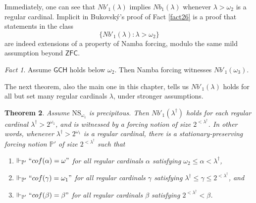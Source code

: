\documentclass[12pt, twoside]{memoir}
\numberwithin{equation}{section}
\newtheorem{thm}{Theorem}[section]
\theoremstyle{definition}
\theoremstyle{remark}
\newtheorem{fact}[thm]{Fact}
\theoremstyle{definition}
\theoremstyle{definition}
\theoremstyle{definition}
\theoremstyle{remark}
\begin{document}
Immediately, one can see that $Nb'_1(\lambda)$ implies $Nb_1(\lambda)$ whenever $\lambda > \omega_2$ is a regular cardinal. Implicit in Bukovsk\'{y}'s proof of Fact \ref{fact26} is a proof that statements in the class
\begin{equation*}
    \{Nb'_1(\lambda) : \lambda > \omega_2\}
\end{equation*}
are indeed extensions of a property of Namba forcing, modulo the same mild assumption beyond $\mathsf{ZFC}$.

\begin{fact}
Assume $\mathsf{GCH}$ holds below $\omega_2$. Then Namba forcing witnesses $Nb'_1(\omega_3)$.
\end{fact}

The next theorem, also the main one in this chapter, tells us $Nb'_1(\lambda)$ holds for all but set many regular cardinals $\lambda$, under stronger assumptions.

\begin{thm}\label{notion1}
Assume $\mathrm{NS}_{\omega_1}$ is precipitous. Then $Nb'_1(\lambda^{\dagger})$ holds for each regular cardinal $\lambda^{\dagger} > 2^{\omega_1}$, and is witnessed by a forcing notion of size $2^{< \lambda^{\dagger}}$. In other words, whenever $\lambda^{\dagger} > 2^{\omega_1}$ is a regular cardinal, there is a stationary-preserving forcing notion $\mathbb{P}'$ of size $2^{< \lambda^{\dagger}}$ such that 
\begin{enumerate}[label=(\arabic*)]
    \item\label{cond1} $\Vdash_{\mathbb{P}'} ``cof(\alpha) = \omega"$ for all regular cardinals $\alpha$ satisfying $\omega_2 \leq \alpha < \lambda^{\dagger}$,
    \item\label{cond2} $\Vdash_{\mathbb{P}'} ``cof(\gamma) = \omega_1"$ for all regular cardinals $\gamma$ satisfying $\lambda^{\dagger} \leq \gamma \leq 2^{< \lambda^{\dagger}}$, and
    \item\label{cond3} $\Vdash_{\mathbb{P}'} ``cof(\beta) = \beta"$ for all regular cardinals $\beta$ satisfying $2^{< \lambda^{\dagger}} < \beta$.
\end{enumerate}
\end{thm}
\end{document}

